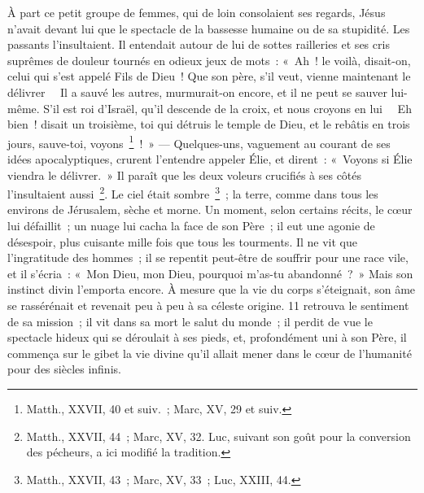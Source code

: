 \documentclass[french,twoside]{book} %
\begin{document}
À part ce petit groupe de femmes, qui de loin consolaient ses regards, Jésus n’avait devant lui que le spectacle de la bassesse humaine ou de sa stupidité. Les passants l’insultaient. Il entendait autour de lui de sottes railleries et ses cris suprêmes de douleur tournés en odieux jeux de mots : « Ah ! le voilà, disait-on, celui qui s’est appelé Fils de Dieu ! Que son père, s’il veut, vienne maintenant le délivrer   Il a sauvé les autres, murmurait-on encore, et il ne peut se sauver lui-même. S’il est roi d’Israël, qu’il descende de la croix, et nous croyons en lui   Eh bien ! disait un troisième, toi qui détruis le temple de Dieu, et le rebâtis en trois jours, sauve-toi, voyons \footnote{Matth., XXVII, 40 et suiv. ; Marc, XV, 29 et suiv.} ! » — Quelques-uns, vaguement au courant de ses idées apocalyptiques, crurent l’entendre appeler Élie, et dirent : « Voyons si Élie viendra le délivrer. » Il paraît que les deux voleurs crucifiés à ses côtés l’insultaient aussi \footnote{Matth., XXVII, 44 ; Marc, XV, 32. Luc, suivant son goût pour la conversion des pécheurs, a ici modifié la tradition.}. Le ciel était sombre \footnote{Matth., XXVII, 43 ; Marc, XV, 33 ; Luc, XXIII, 44.} ; la terre, comme dans tous les environs de Jérusalem, sèche et morne. Un moment, selon certains récits, le cœur lui défaillit ; un nuage lui cacha la face de son Père ; il eut une agonie de désespoir, plus cuisante mille fois que tous les tourments. Il ne vit que l’ingratitude des hommes ; il se repentit peut-être de souffrir pour une race vile, et il s’écria : « Mon Dieu, mon Dieu, pourquoi m’as-tu abandonné ? » Mais son instinct divin l’emporta encore. À mesure que la vie du corps s’éteignait, son âme se rassérénait et revenait peu à peu à sa céleste origine. 11 retrouva le sentiment de sa mission ; il vit dans sa mort le salut du monde ; il perdit de vue le spectacle hideux qui se déroulait à ses pieds, et, profondément uni à son Père, il commença sur le gibet la vie divine qu’il allait mener dans le cœur de l’humanité pour des siècles infinis.\par
\end{document}

